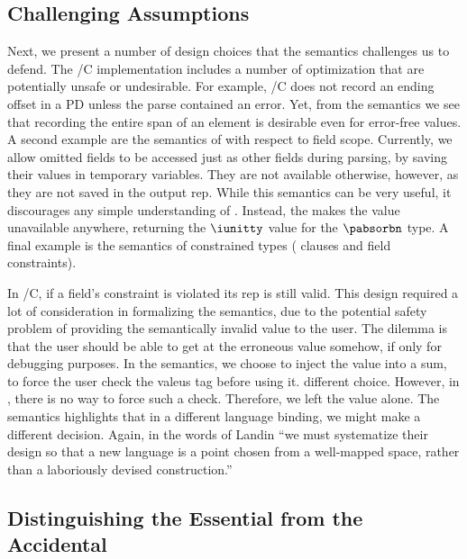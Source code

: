 \subsection{Challenging Assumptions}

Next, we present a number of design choices that the semantics
challenges us to defend. The \pads{}/C implementation includes a
number of optimization that are potentially unsafe or undesirable.
For example, \pads{}/C does not record an ending offset in a PD unless
the parse contained an error. Yet, from the semantics we see that
recording the entire span of an element is desirable even for
error-free values.  A second example are the semantics of \Pomit{}
with respect to field scope. Currently, we allow omitted fields to be
accessed just as other fields during parsing, by saving their values
in temporary variables.  They are not available otherwise, however, as
they are not saved in the output rep. While this semantics can be very
useful, it discourages any simple understanding of \Pomit{}. Instead,
the \ddc{} makes the value unavailable anywhere, returning the
$\iunitty$ value for the $\pabsorbn$ type. A final example is the
semantics of constrained types (\Pwhere{} clauses and field
constraints).

In \pads{}/C, if a field's constraint is violated its rep is still
valid. This design required a lot of consideration in formalizing the
semantics, due to the potential safety problem of providing the
semantically invalid value to the user.  The dilemma is that the user
should be able to get at the erroneous value somehow, if only for
debugging purposes. In the semantics, we choose to inject the value
into a sum, to force the user check the valeus tag before using it.
different choice. However, in \C{}, there is no way to force such a
check. Therefore, we left the value alone. The semantics highlights
that in a different language binding, we might make a different
decision.  Again, in the words of Landin ``we must systematize their
design so that a new language is a point chosen from a well-mapped
space, rather than a laboriously devised construction.''

\subsection{Distinguishing the Essential from the Accidental}

